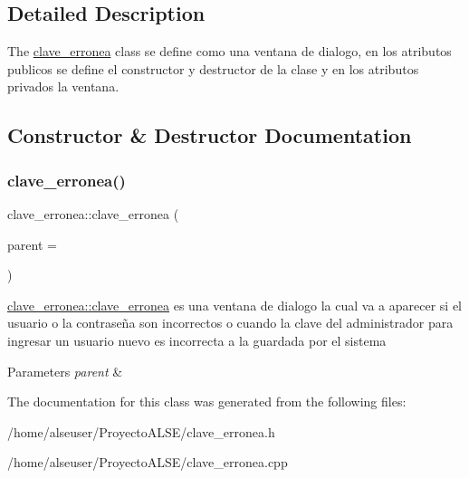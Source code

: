 \subsection{Detailed Description}
The \hyperlink{classclave__erronea}{clave\+\_\+erronea} class se define como una ventana de dialogo, en los atributos publicos se define el constructor y destructor de la clase y en los atributos privados la ventana. 

\subsection{Constructor \& Destructor Documentation}
\mbox{\label{classclave__erronea_ac304b7fa422028fb2f4a63a0b18da520}} 
\subsubsection{\texorpdfstring{clave\+\_\+erronea()}{clave\_erronea()}}
{\footnotesize\ttfamily clave\+\_\+erronea\+::clave\+\_\+erronea (\begin{DoxyParamCaption}\item[{Q\+Widget $\ast$}]{parent = {} }\end{DoxyParamCaption})\hspace{0.3cm}{\ttfamily [explicit]}}



\hyperlink{classclave__erronea_ac304b7fa422028fb2f4a63a0b18da520}{clave\+\_\+erronea\+::clave\+\_\+erronea} es una ventana de dialogo la cual va a aparecer si el usuario o la contraseña son incorrectos o cuando la clave del administrador para ingresar un usuario nuevo es incorrecta a la guardada por el sistema 


\begin{DoxyParams}{Parameters}
{\em parent} & \\
\hline
\end{DoxyParams}


The documentation for this class was generated from the following files\+:\begin{DoxyCompactItemize}
\item 
/home/alseuser/\+Proyecto\+A\+L\+S\+E/clave\+\_\+erronea.\+h\item 
/home/alseuser/\+Proyecto\+A\+L\+S\+E/clave\+\_\+erronea.\+cpp\end{DoxyCompactItemize}
